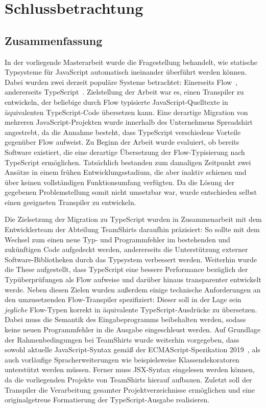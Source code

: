 \chapter{Schlussbetrachtung}
\label{chap:conclusion}

\section{Zusammenfassung}

In der vorliegende Masterarbeit wurde die Fragestellung behandelt, wie statische Typsysteme für JavaScript automatisch ineinander überführt werden können. Dabei wurden zwei derzeit populäre Systeme betrachtet: Einerseits Flow~\autocite{FLOW:PAPER}, andererseits TypeScript~\autocite{TYPESCRIPT:SPEC}. Zielstellung der Arbeit war es, einen Transpiler zu entwickeln, der beliebige durch Flow typisierte JavaScript-Quelltexte in äquivalenten TypeScript-Code übersetzen kann. Eine derartige Migration von mehreren JavaScript-Projekten wurde innerhalb des Unternehmens Spreadshirt angestrebt, da die Annahme besteht, dass TypeScript verschiedene Vorteile gegenüber Flow aufweist. Zu Beginn der Arbeit wurde evaluiert, ob bereits Software existiert, die eine derartige Übersetzung der Flow-Typisierung nach TypeScript ermöglichen. Tatsächlich bestanden zum damaligen Zeitpunkt zwei Ansätze in einem frühen Entwicklungsstadium, die aber inaktiv schienen und über keinen vollständigen Funktionsumfang verfügten. Da die Lösung der gegebenen Problemstellung somit nicht umsetzbar war, wurde entschieden selbst einen geeigneten Transpiler zu entwickeln.

Die Zielsetzung der Migration zu TypeScript wurden in Zusammenarbeit mit dem Entwicklerteam der Abteilung TeamShirts daraufhin präzisiert: So sollte mit dem Wechsel zum einen neue Typ- und Programmfehler im bestehenden und zukünftigen Code aufgedeckt werden, andererseits die Unterstützung externer Software-Bibliotheken durch das Typsystem verbessert werden. Weiterhin wurde die These aufgestellt, dass TypeScript eine bessere Performance bezüglich der Typüberprüfungen als Flow aufweise und darüber hinaus transparenter entwickelt werde. Neben diesen Zielen wurden außerdem einige technische Anforderungen an den umzusetzenden Flow-Transpiler spezifiziert: Dieser soll in der Lage sein \emph{jegliche} Flow-Typen korrekt in äquivalente TypeScript-Ausdrücke zu übersetzen. Dabei muss die Semantik des Eingabeprogramms beibehalten werden, sodass keine neuen Programmfehler in die Ausgabe eingeschleust werden. Auf Grundlage der Rahmenbedingungen bei TeamShirts wurde weiterhin vorgegeben, dass sowohl aktuelle JavaScript-Syntax gemäß der ECMAScript-Spezikation 2019~\autocite{ECMASCRIPT:2019}, als auch vorläufige Spracherweiterungen wie beispielsweise Klassendekoratoren unterstützt werden müssen. Ferner muss JSX-Syntax eingelesen werden können, da die vorliegenden Projekte von TeamShirts hierauf aufbauen. Zuletzt soll der Transpiler die Verarbeitung gesamter Projektverzeichnisse ermöglichen und eine originalgetreue Formatierung der TypeScript-Ausgabe realisieren.

